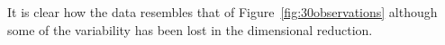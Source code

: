 It is clear how the data resembles that of Figure~\ref{fig:30observations} although some of the variability has been lost in the dimensional reduction.

%
%
